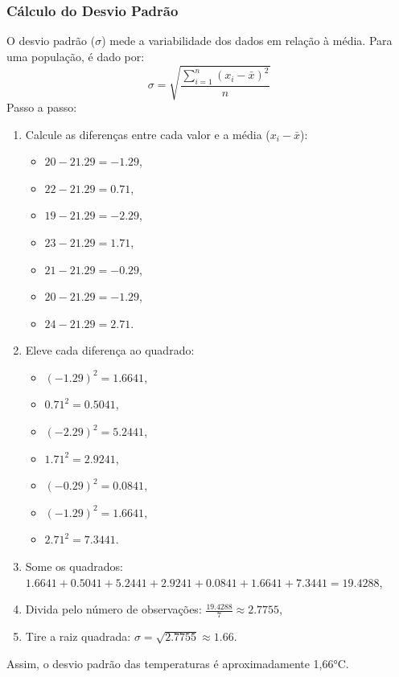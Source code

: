 \documentclass[a4paper,12pt,openany]{book}
\begin{document}
\subsubsection{Cálculo do Desvio Padrão}
O desvio padrão (\(\sigma\)) mede a variabilidade dos dados em relação à média. Para uma população, é dado por:
\begin{equation}
\sigma = \sqrt{\frac{\sum_{i=1}^{n} (x_i - \bar{x})^2}{n}}
\end{equation}
Passo a passo:
\begin{enumerate}
    \item Calcule as diferenças entre cada valor e a média (\(x_i - \bar{x}\)):
    \begin{itemize}
        \item \(20 - 21.29 = -1.29\),
        \item \(22 - 21.29 = 0.71\),
        \item \(19 - 21.29 = -2.29\),
        \item \(23 - 21.29 = 1.71\),
        \item \(21 - 21.29 = -0.29\),
        \item \(20 - 21.29 = -1.29\),
        \item \(24 - 21.29 = 2.71\).
    \end{itemize}
    \item Eleve cada diferença ao quadrado:
    \begin{itemize}
        \item \((-1.29)^2 = 1.6641\),
        \item \(0.71^2 = 0.5041\),
        \item \((-2.29)^2 = 5.2441\),
        \item \(1.71^2 = 2.9241\),
        \item \((-0.29)^2 = 0.0841\),
        \item \((-1.29)^2 = 1.6641\),
        \item \(2.71^2 = 7.3441\).
    \end{itemize}
    \item Some os quadrados: \(1.6641 + 0.5041 + 5.2441 + 2.9241 + 0.0841 + 1.6641 + 7.3441 = 19.4288\),
    \item Divida pelo número de observações: \(\frac{19.4288}{7} \approx 2.7755\),
    \item Tire a raiz quadrada: \(\sigma = \sqrt{2.7755} \approx 1.66\).
\end{enumerate}
Assim, o desvio padrão das temperaturas é aproximadamente 1,66°C.
\end{document}
